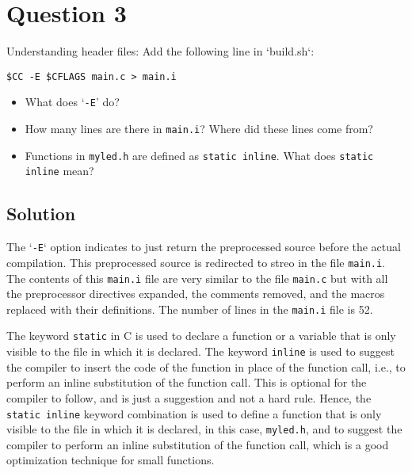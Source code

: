 \section*{Question 3}

Understanding header files:
Add the following line in `build.sh`:
\begin{verbatim}
$CC -E $CFLAGS main.c > main.i
\end{verbatim}
\begin{itemize}[noitemsep]
    \item What does `\texttt{-E}' do?
    \item How many lines are there in \texttt{main.i}? Where did these lines come from?
    \item Functions in \texttt{myled.h} are defined as \texttt{static inline}.
          What does \texttt{static inline} mean?
\end{itemize}

\subsection*{Solution}

The `\texttt{-E}` option indicates to just return the preprocessed source before the actual compilation.
This preprocessed source is redirected to streo in the file \texttt{main.i}.
The contents of this \texttt{main.i} file are very similar to the file \texttt{main.c} but with all the preprocessor directives expanded, the comments removed, and the macros replaced with their definitions.
The number of lines in the \texttt{main.i} file is 52.

The keyword \texttt{static} in C is used to declare a function or a variable that is only visible to the file in which it is declared.
The keyword \texttt{inline} is used to suggest the compiler to insert the code of the function in place of the function call, i.e., to perform an inline substitution of the function call.
This is optional for the compiler to follow, and is just a suggestion and not a hard rule.
Hence, the \texttt{static inline} keyword combination is used to define a function that is only visible to the file in which it is declared, in this case, \texttt{myled.h}, and to suggest the compiler to perform an inline substitution of the function call, which is a good optimization technique for small functions.
